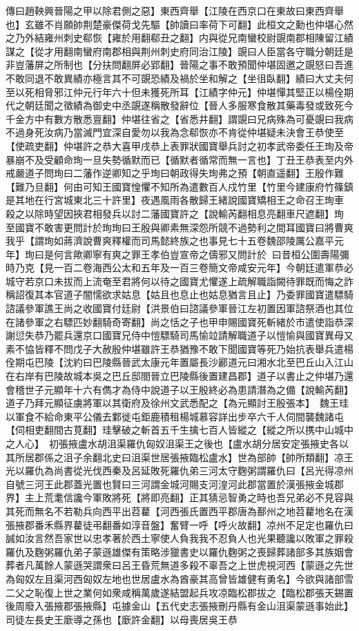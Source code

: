 傳曰趙鞅興晉陽之甲以除君側之惡】東西齊舉【江陵在西京口在東故曰東西齊舉也】玄雖不肖願帥荆楚豪傑荷戈先驅【帥讀曰率荷下可翻】此桓文之勳也仲堪心然之乃外結雍州刺史郗恢【雍於用翻郗丑之翻】内與從兄南蠻校尉覬南郡相陳留江績謀之【從才用翻南蠻府南郡相與荆州刺史府同治江陵】覬曰人臣當各守職分朝廷是非豈藩屏之所制也【分扶問翻屏必郢翻】晉陽之事不敢預聞仲堪固邀之覬怒曰吾進不敢同退不敢異績亦極言其不可覬恐績及禍於坐和解之【坐徂臥翻】績曰大丈夫何至以死相脅邪江仲元行年六十但未獲死所耳【江績字仲元】仲堪憚其堅正以楊佺期代之朝廷聞之徵績為御史中丞覬遂稱散發辭位【晉人多服寒食散其藥毒發或致死今千金方中有數方散悉亶翻】仲堪往省之【省悉井翻】謂覬曰兄病殊為可憂覬曰我病不過身死汝病乃當滅門宜深自愛勿以我為念郗恢亦不肯從仲堪疑未決會王恭使至【使疏吏翻】仲堪許之恭大喜甲戌恭上表罪狀國寶舉兵討之初孝武帝委任王珣及帝暴崩不及受顧命珣一旦失勢循默而已【循默者循常而無一言也】丁丑王恭表至内外戒嚴道子問珣曰二藩作逆卿知之乎珣曰朝政得失珣弗之預【朝直遥翻】王殷作難【難乃旦翻】何由可知王國寶惶懼不知所為遣數百人戍竹里【竹里今建康府竹篠鎮是其地在行宮城東北三十許里】夜遇風雨各散歸王緒說國寶矯相王之命召王珣車殺之以除時望因挾君相發兵以討二藩國寶許之【說輸芮翻相息亮翻車尺遮翻】珣至國寶不敢害更問計於珣珣曰王殷與卿素無深怨所競不過勢利之間耳國寶曰將曹爽我乎【謂珣如蔣濟說曹爽釋權而司馬懿終族之也事見七十五卷魏邵陵厲公嘉平元年】珣曰是何言歟卿寧有爽之罪王孝伯豈宣帝之儔邪又問計於曰昔桓公圍壽陽彌時乃克【見一百二卷海西公太和五年及一百三卷簡文帝咸安元年】今朝廷遣軍恭必城守若京口未拔而上流奄至君將何以待之國寶尤懼遂上疏解職詣闕待罪既而悔之詐稱詔復其本官道子闇懦欲求姑息【姑且也息止也姑息猶言且止】乃委罪國寶遣驃騎諮議參軍譙王尚之收國寶付廷尉【洪景伯曰諮議參軍晉江左初置因軍諮祭酒也其位在諸參軍之右驃匹妙翻騎奇寄翻】尚之恬之子也甲申賜國寶死斬緒於市遣使詣恭深謝愆失恭乃罷兵還京口國寶兄侍中愷驃騎司馬愉竝請解職道子以愷愉與國寶異母又素不恊皆釋不問戊子大赦殷仲堪雖許王恭猶豫不敢下聞國寶等死乃始抗表舉兵遣楊佺期屯巴陵【沈約曰巴陵縣晉武太康元年置屬長沙酈道元曰湘水北至巴丘山入江山在右岸有巴陵故城本吳之巴丘邸閤晉立巴陵縣後置建昌郡】道子以書止之仲堪乃還會稽世子元顯年十六有儁才為侍中說道子以王殷終必為患請潛為之備【說輸芮翻】道子乃拜元顯征虜將軍以其衛府及徐州文武悉配之【為元顯討王殷張本】　魏王珪以軍食不給命東平公儀去鄴徙屯鉅鹿積租楊城慕容詳出步卒六千人伺間襲魏諸屯【伺相吏翻間古莧翻】珪擊破之斬首五千生擒七百人皆縱之【縱之所以携中山城中之人心】　初張掖盧水胡沮渠羅仇匈奴沮渠王之後也【盧水胡分居安定張掖史各以其所居郡係之沮子余翻北史曰沮渠世居張掖臨松盧水】世為部帥【帥所類翻】凉王光以羅仇為尚書從光伐西秦及呂延敗死羅仇弟三河太守麴粥謂羅仇曰【呂光得凉州自號三河王此郡蓋光置也賢曰三河謂金城河賜支河湟河此郡當置於漢張掖金城郡界】主上荒耄信讒今軍敗將死【將即亮翻】正其猜忌智勇之時也吾兄弟必不見容與其死而無名不若勒兵向西平出苕藋【河西張氏置西平郡唐為鄯州之地苕藋地名在漢張掖郡番禾縣界藋徒弔翻番如淳音盤】奮臂一呼【呼火故翻】凉州不足定也羅仇曰誠如汝言然吾家世以忠孝著於西土寧使人負我我不忍負人也光果聽讒以敗軍之罪殺羅仇及麴粥羅仇弟子蒙遜雄傑有策略涉獵書史以羅仇麴粥之喪歸葬諸部多其族姻會葬者凡萬餘人蒙遜哭謂衆曰呂王昏荒無道多殺不辜吾之上世虎視河西【蒙遜之先世為匈奴左且渠河西匈奴左地也世居盧水為酋豪其高曾皆雄健有勇名】今欲與諸部雪二父之恥復上世之業何如衆咸稱萬歲遂結盟起兵攻凉臨松郡拔之【臨松郡張天錫置後周廢入張掖郡張掖縣】屯據金山【五代史志張掖刪丹縣有金山沮渠蒙遜事始此】司徒左長史王廞導之孫也【廞許金翻】以母喪居吳王恭


